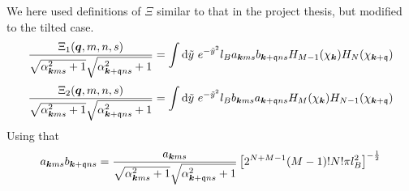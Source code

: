 We here used definitions of \( \Xi \) similar to that in the project thesis, but modified to the tilted case.
\begin{equation}
  \label{eq:30}
  \frac{\Xi_1 ( \bm{q}, m, n, s )}{
    \sqrt{\alpha _{\bm{k} m s}^2 + 1}
    \sqrt{\alpha _{\bm{k} + \mathfrak{q} n s} ^2 + 1}
  }
  =
  \int \mathrm{d} \tilde{y}
  ~e^{-\tilde{y}^2}
  l_{B}
  a_{\bm{k} m s} b_{\bm{k} + \mathfrak{q} ns}
  H_{M-1} (\chi_{\bm{k}})
  H_N ( \chi _{\bm{k} + \mathfrak{q}} )
\end{equation}
\begin{equation}
  \label{eq:31}
  \frac{\Xi_2 ( \bm{q}, m, n, s )}{
    \sqrt{\alpha _{\bm{k} m s}^2 + 1}
    \sqrt{\alpha _{\bm{k} + \mathfrak{q} n s} ^2 + 1}
  }
  =
  \int \mathrm{d} \tilde{y}
  ~e^{-\tilde{y}^2}
  l_{B}
  b_{\bm{k} m s} a_{\bm{k} + \mathfrak{q} ns}
  H_{M} (\chi_{\bm{k}})
  H_{N-1} ( \chi _{\bm{k} + \mathfrak{q}} )
\end{equation}
Using that
\begin{equation}
  \label{eq:31}
  a_{\bm{k} m s} b_{\bm{k} +\mathfrak{q} ns}
  =
  \frac{a_{\bm{k} m s}}{\sqrt{\alpha _{\bm{k} m s} ^2 + 1} \sqrt{\alpha _{\bm{k} + \mathfrak{q} ns} ^2  + 1}  }
  \left[
  2^{N+M-1} (M-1)! N! \pi l_{B}^2
\right  ]^{-\frac{1}{2}}
\end{equation}


